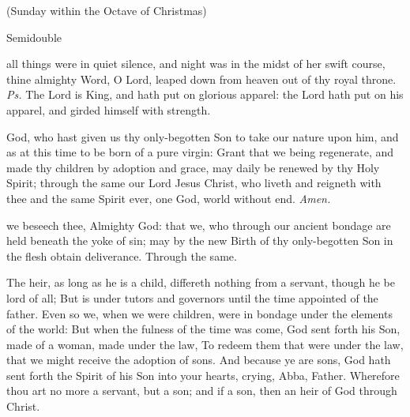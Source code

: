 
\centerline{\small{(Sunday within the Octave of Christmas)}}

\fancyhead[RE,LO]{}
\begin{inhead}
{Semidouble}
\end{inhead}

\introit
{} all things were in quiet silence, and night was in the midst of her swift course, thine almighty Word, O Lord, leaped down from heaven out of thy royal throne. \textit{Ps.} The Lord is King, and hath put on glorious apparel: the Lord hath put on his apparel, and girded himself with strength.

\collect
{} God, who hast given us thy only-begotten Son to take our nature upon him, and as at this time to be born of a pure virgin: Grant that we being regenerate, and made thy children by adoption and grace, may daily be renewed by thy Holy Spirit; through the same our Lord Jesus Christ, who liveth and reigneth with thee and the same Spirit ever, one God, world without end. \textit{Amen.}

 we beseech thee, Almighty God: that we, who through our ancient bondage are held beneath the yoke of sin; may by the new Birth of thy only-begotten Son in the flesh obtain deliverance. Through the same.

 The heir, as long as he is a child, differeth nothing from a servant, though he be lord of all; But is under tutors and governors until the time appointed of the father. Even so we, when we were children, were in bondage under the elements of the world: But when the fulness of the time was come, God sent forth his Son, made of a woman, made under the law, To redeem them that were under the law, that we might receive the adoption of sons. And because ye are sons, God hath sent forth the Spirit of his Son into your hearts, crying, Abba, Father. Wherefore thou art no more a servant, but a son; and if a son, then an heir of God through Christ.

